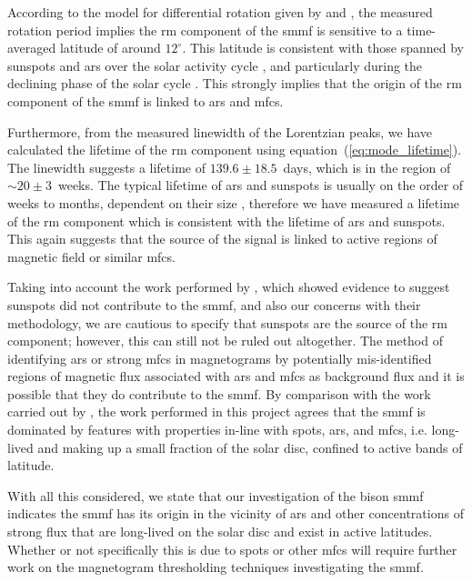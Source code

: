 According to the model for differential rotation given by \citet{snodgrass_magnetic_1983} and \citet{brown_inferring_1989}, the measured rotation period implies the \gls{rm} component of the \gls{smmf} is sensitive to a time-averaged latitude of around $12^{\circ}$. This latitude is consistent with those spanned by sunspots and \glspl{ar} over the solar activity cycle \citep{maunder_note_1904, mcintosh_deciphering_2014}, and particularly during the declining phase of the solar cycle \citep{thomas_asteroseismic_2019}. This strongly implies that the origin of the \gls{rm} component of the \gls{smmf} is linked to \glspl{ar} and \glspl{mfc}.

Furthermore, from the measured linewidth of the Lorentzian peaks, we have calculated the lifetime of the \gls{rm} component using equation~(\ref{eq:mode_lifetime}). The linewidth suggests a lifetime of $139.6 \pm 18.5$~days, which is in the region of $\sim 20\pm3$~weeks. The typical lifetime of \glspl{ar} and sunspots is usually on the order of weeks to months, dependent on their size \citep{zwaan_solar_1981, schrijver_photospheric_1994, howard_sunspot_2001, hathaway_sunspot_2008, van_driel-gesztelyi_evolution_2015}, therefore we have measured a lifetime of the \gls{rm} component which is consistent with the lifetime of \glspl{ar} and sunspots. This again suggests that the source of the signal is linked to active regions of magnetic field or similar \glspl{mfc}.

Taking into account the work performed by \citet{bose_variability_2018}, which showed evidence to suggest sunspots did not contribute to the \gls{smmf}, and also our concerns with their methodology, we are cautious to specify that sunspots are the source of the \gls{rm} component; however, this can still not be ruled out altogether. The method of identifying \glspl{ar} or strong \glspl{mfc} in magnetograms by \citet{bose_variability_2018} potentially mis-identified regions of magnetic flux associated with \glspl{ar} and \glspl{mfc} as background flux and it is possible that they do contribute to the \gls{smmf}. By comparison with the work carried out by \citet{kutsenko_contribution_2017}, the work performed in this project agrees that the \gls{smmf} is dominated by features with properties in-line with spots, \glspl{ar}, and \glspl{mfc}, i.e. long-lived and making up a small fraction of the solar disc, confined to active bands of latitude.

With all this considered, we state that our investigation of the \gls{bison} \gls{smmf} indicates the \gls{smmf} has its origin in the vicinity of \glspl{ar} and other concentrations of strong flux that are long-lived on the solar disc and exist in active latitudes. Whether or not specifically this is due to spots or other \glspl{mfc} will require further work on the magnetogram thresholding techniques investigating the \gls{smmf}.


